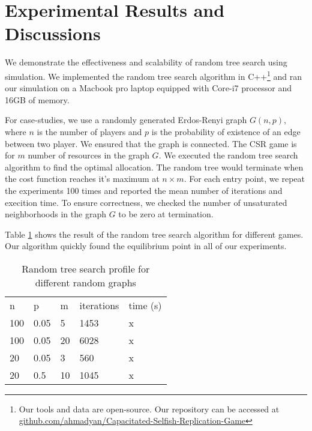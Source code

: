 \section{Experimental Results and Discussions}\label{sec:results}
We demonstrate the effectiveness and scalability of random tree search using simulation.
We implemented the random tree search algorithm in C++\footnote{Our tools and data are open-source. Our repository can be accessed at \url{github.com/ahmadyan/Capacitated-Selfish-Replication-Game}} and ran our simulation on a Macbook pro laptop equipped with Core-i7 processor and 16GB of memory.

For case-studies, we use a randomly generated Erdos-Renyi graph $G(n,p)$, where $n$ is the number of players and $p$ is the probability of existence of an edge between two player. We ensured that the graph is connected. The CSR game is for $m$ number of resources in the graph $G$. We executed the random tree search algorithm to find the optimal allocation. The random tree would terminate when the cost function reaches it's maximum at $n\times m$. For each entry point, we repeat the experiments 100 times and reported the mean number of iterations and execition time. To ensure correctness, we checked the number of unsaturated neighborhoods in the graph $G$ to be zero at termination.

Table \ref{tab:result1} shows the result of the random tree search algorithm for different games.
Our algorithm quickly found the equilibrium point in all of our experiments.

\begin{table}[]
\centering
\caption{Random tree search profile for different random graphs}
\label{tab:result1}
\begin{tabular}{lllll}
n   & p    & m  & iterations & time (s) \\
100 & 0.05 & 5  & 1453       & x        \\
100 & 0.05 & 20 & 6028       & x        \\
20  & 0.05 & 3  & 560        & x        \\
20  & 0.5  & 10 & 1045       & x
\end{tabular}
\end{table}


